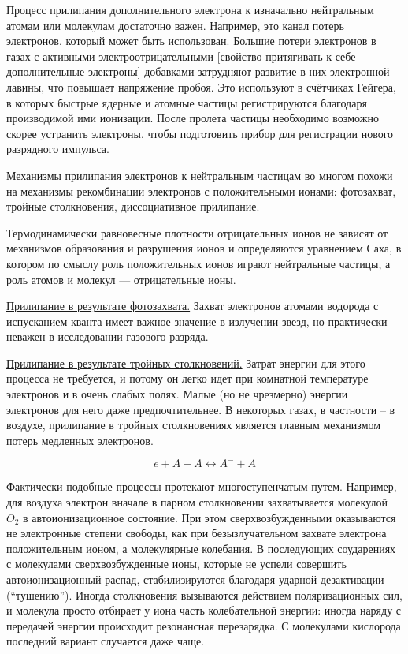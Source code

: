 \documentclass[10pt, a4paper]{article}
\numberwithin{equation}{section}
\begin{document}
Процесс прилипания дополнительного электрона к изначально нейтральным атомам или молекулам достаточно важен. Например, это канал потерь электронов, который может быть использован. Большие потери электронов в газах с активными электроотрицательными [свойство притягивать к себе дополнительные электроны] добавками затрудняют развитие в них электронной лавины, что повышает напряжение пробоя. Это используют в счётчиках Гейгера, в которых быстрые ядерные и атомные частицы регистрируются благодаря производимой ими ионизации. После пролета частицы необходимо возможно скорее устранить электроны, чтобы подготовить прибор для регистрации нового разрядного импульса.
 
Механизмы прилипания электронов к нейтральным частицам во многом похожи на механизмы рекомбинации электронов с положительными ионами: фотозахват, тройные столкновения, диссоциативное прилипание.
 
Термодинамически равновесные плотности отрицательных ионов не зависят от механизмов образования и разрушения ионов и определяются уравнением Саха, в котором по смыслу роль положительных ионов играют нейтральные частицы, а роль атомов и молекул — отрицательные ионы.

\uline{Прилипание в результате фотозахвата.} Захват электронов атомами водорода с испусканием кванта имеет важное значение в излучении звезд, но практически неважен в исследовании газового разряда.

\uline{Прилипание в результате тройных столкновений.} Затрат энергии для этого процесса не требуется, и потому он легко идет при комнатной температуре электронов и в очень слабых полях. Малые (но не чрезмерно) энергии электронов для него даже предпочтительнее. В некоторых газах, в частности -- в воздухе, прилипание в тройных столкновениях является главным механизмом потерь медленных электронов.

\begin{equation*}
	e + A + A \leftrightarrow A^{-} + A
\end{equation*}

Фактически подобные процессы протекают многоступенчатым путем. Например, для воздуха электрон вначале в парном столкновении захватывается молекулой $O_2$ в автоионизационное состояние. При этом сверхвозбужденными оказываются не электронные степени свободы, как при безызлучательном захвате электрона положительным ионом, а молекулярные колебания. В последующих соударениях с молекулами сверхвозбужденные ионы, которые не успели совершить автоионизационный распад, стабилизируются благодаря ударной дезактивации (``тушению''). Иногда столкновения вызываются действием поляризационных сил, и молекула просто отбирает у иона часть колебательной энергии: иногда наряду с передачей энергии происходит резонансная перезарядка. С молекулами кислорода последний вариант случается даже чаще.
\end{document}
